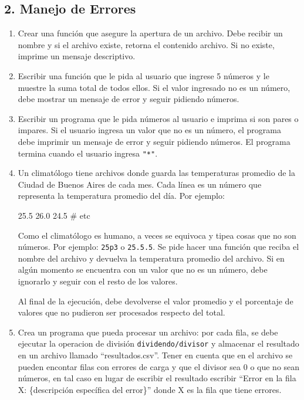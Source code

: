 \documentclass[
  letterpaper,
  DIV=11,
  numbers=noendperiod]{scrreprt}
\newenvironment{Shaded}{\begin{snugshade}}{\end{snugshade}}
\newcommand{\CommentTok}[1]{\textcolor[rgb]{0.37,0.37,0.37}{#1}}
\newcommand{\ExtensionTok}[1]{\textcolor[rgb]{0.00,0.23,0.31}{#1}}
\begin{document}
\subsection*{2. Manejo de Errores}\label{manejo-de-errores-1}

\begin{enumerate}
\def\labelenumi{\arabic{enumi}.}
\item
  Crear una función que asegure la apertura de un archivo. Debe recibir
  un nombre y si el archivo existe, retorna el contenido archivo. Si no
  existe, imprime un mensaje descriptivo.
\item
  Escribir una función que le pida al usuario que ingrese 5 números y le
  muestre la suma total de todos ellos. Si el valor ingresado no es un
  número, debe mostrar un mensaje de error y seguir pidiendo números.
\item
  Escribir un programa que le pida números al usuario e imprima si son
  pares o impares. Si el usuario ingresa un valor que no es un número,
  el programa debe imprimir un mensaje de error y seguir pidiendo
  números. El programa termina cuando el usuario ingresa \texttt{"*"}.
\item
  Un climatólogo tiene archivos donde guarda las temperaturas promedio
  de la Ciudad de Buenos Aires de cada mes. Cada línea es un número que
  representa la temperatura promedio del día. Por ejemplo:

\begin{Shaded}
\begin{Highlighting}[]
\ExtensionTok{25.5}
\ExtensionTok{26.0}
\ExtensionTok{24.5}
\CommentTok{\# etc}
\end{Highlighting}
\end{Shaded}

  Como el climatólogo es humano, a veces se equivoca y tipea cosas que
  no son números. Por ejemplo: \texttt{25p3} o \texttt{25.5.5}. Se pide
  hacer una función que reciba el nombre del archivo y devuelva la
  temperatura promedio del archivo. Si en algún momento se encuentra con
  un valor que no es un número, debe ignorarlo y seguir con el resto de
  los valores.

  Al final de la ejecución, debe devolverse el valor promedio y el
  porcentaje de valores que no pudieron ser procesados respecto del
  total.
\item
  Crea un programa que pueda procesar un archivo: por cada fila, se debe
  ejecutar la operacion de división \texttt{dividendo/divisor} y
  almacenar el resultado en un archivo llamado ``resultados.csv''. Tener
  en cuenta que en el archivo se pueden encontar filas con errores de
  carga y que el divisor sea 0 o que no sean números, en tal caso en
  lugar de escribir el resultado escribir ``Error en la fila X:
  \{descripción específica del error\}'' donde X es la fila que tiene
  errores.


\end{enumerate}
\end{document}
